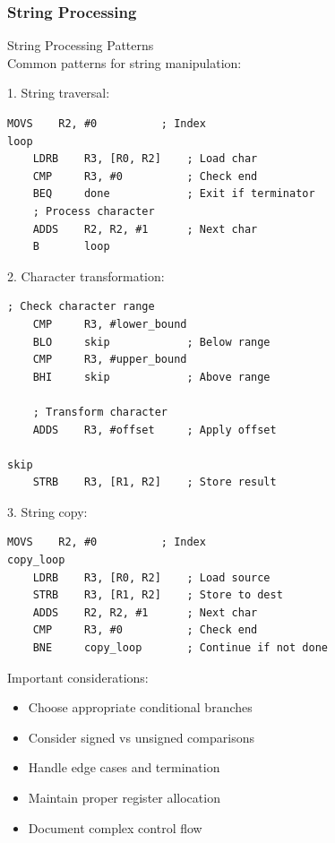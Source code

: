 \subsubsection{String Processing}

\begin{KR}{String Processing Patterns}\\
Common patterns for string manipulation:

1. String traversal:
\begin{lstlisting}[language=armasm, style=basesmol]
    MOVS    R2, #0          ; Index
loop
    LDRB    R3, [R0, R2]    ; Load char
    CMP     R3, #0          ; Check end
    BEQ     done            ; Exit if terminator
    ; Process character
    ADDS    R2, R2, #1      ; Next char
    B       loop
\end{lstlisting}

2. Character transformation:
\begin{lstlisting}[language=armasm, style=basesmol]
    ; Check character range
    CMP     R3, #lower_bound
    BLO     skip            ; Below range
    CMP     R3, #upper_bound
    BHI     skip            ; Above range
    
    ; Transform character
    ADDS    R3, #offset     ; Apply offset
    
skip
    STRB    R3, [R1, R2]    ; Store result
\end{lstlisting}

3. String copy:
\begin{lstlisting}[language=armasm, style=basesmol]
    MOVS    R2, #0          ; Index
copy_loop
    LDRB    R3, [R0, R2]    ; Load source
    STRB    R3, [R1, R2]    ; Store to dest
    ADDS    R2, R2, #1      ; Next char
    CMP     R3, #0          ; Check end
    BNE     copy_loop       ; Continue if not done
\end{lstlisting}
\end{KR}

\begin{remark}
Important considerations:
\begin{itemize}
  \item Choose appropriate conditional branches
  \item Consider signed vs unsigned comparisons
  \item Handle edge cases and termination
  \item Maintain proper register allocation
  \item Document complex control flow
\end{itemize}
\end{remark}

